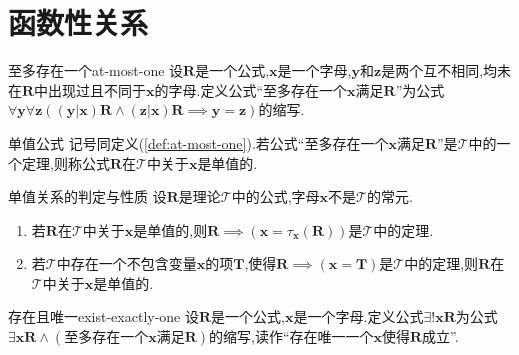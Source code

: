 \section{函数性关系}

\begin{definition}{至多存在一个}{at-most-one}
	设$\boldsymbol{R}$是一个公式,$\boldsymbol{x}$是一个字母,$\boldsymbol{y}$和$\boldsymbol{z}$是两个互不相同,均未在$\boldsymbol{R}$中出现过且不同于$\boldsymbol{x}$的字母.定义公式``至多存在一个$\boldsymbol{x}$满足$\boldsymbol{R}$''为公式$\forall\boldsymbol{y}\forall\boldsymbol{z}\left(\left(\boldsymbol{y}|\boldsymbol{x}\right)\boldsymbol{R}\wedge\left(\boldsymbol{z}|\boldsymbol{x}\right)\boldsymbol{R}\implies\boldsymbol{y}=\boldsymbol{z}\right)$的缩写.
\end{definition}

\begin{definition}{单值公式}{}
	记号同定义(\cref{def:at-most-one}).若公式``至多存在一个$\boldsymbol{x}$满足$\boldsymbol{R}$''是$\mathcal{T}$中的一个定理,则称公式$\boldsymbol{R}$在$\mathcal{T}$中关于$\boldsymbol{x}$是单值的.
\end{definition}

\begin{metatheorem}{单值关系的判定与性质}{}
	设$\boldsymbol{R}$是理论$\mathcal{T}$中的公式,字母$\boldsymbol{x}$不是$\mathcal{T}$的常元.
	\begin{enumerate}
		\item 若$\boldsymbol{R}$在$\mathcal{T}$中关于$\boldsymbol{x}$是单值的,则$\boldsymbol{R}\implies\left(\boldsymbol{x}=\tau_{\boldsymbol{x}}\left(\boldsymbol{R}\right)\right)$是$\mathcal{T}$中的定理.
		\item 若$\mathcal{T}$中存在一个不包含变量$\boldsymbol{x}$的项$\boldsymbol{T}$,使得$\boldsymbol{R}\implies\left(\boldsymbol{x}=\boldsymbol{T}\right)$是$\mathcal{T}$中的定理,则$\boldsymbol{R}$在$\mathcal{T}$中关于$\boldsymbol{x}$是单值的.
	\end{enumerate}
\end{metatheorem}

\begin{definition}{存在且唯一}{exist-exactly-one}
	设$\boldsymbol{R}$是一个公式,$\boldsymbol{x}$是一个字母.定义公式$\exists!\boldsymbol{x}\boldsymbol{R}$为公式$\exists\boldsymbol{x}\boldsymbol{R}\wedge\left(\text{至多存在一个}\boldsymbol{x}\text{满足}\boldsymbol{R}\right)$的缩写,读作``存在唯一一个$\boldsymbol{x}$使得$\boldsymbol{R}$成立''.
\end{definition}

